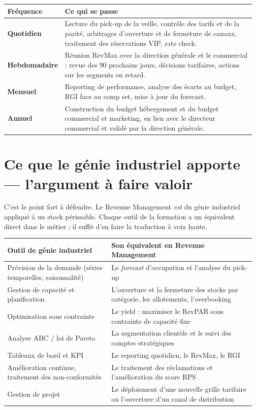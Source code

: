 \documentclass[11pt,a4paper]{article}
\begin{document}
\begin{center}
\small\renewcommand{\arraystretch}{1.1}
\begin{tabularx}{\textwidth}{@{}L{2.9cm} X@{}}
\toprule
{}\textbf{Fréquence} & \textbf{Ce qui se passe} \\
\midrule
\textbf{Quotidien} & Lecture du pick-up de la veille, contrôle des tarifs et de la parité, arbitrages d'ouverture et de fermeture de canaux, traitement des réservations VIP, rate check. \\
\textbf{Hebdomadaire} & Réunion RevMax avec la direction générale et le commercial : revue des 90 prochains jours, décisions tarifaires, actions sur les segments en retard. \\
\textbf{Mensuel} & Reporting de performance, analyse des écarts au budget, RGI face au comp set, mise à jour du forecast. \\
\textbf{Annuel} & Construction du budget hébergement et du budget commercial et marketing, en lien avec le directeur commercial et validé par la direction générale. \\
\bottomrule
\end{tabularx}
\end{center}

\section{Ce que le génie industriel apporte --- l'argument à faire valoir}

C'est le point fort à défendre. Le Revenue Management \emph{est} du génie industriel appliqué à un stock périssable. Chaque outil de la formation a un équivalent direct dans le métier ; il suffit d'en faire la traduction à voix haute.

\begin{center}
\small\renewcommand{\arraystretch}{1.1}
\begin{tabularx}{\textwidth}{@{}L{5.2cm} X@{}}
\toprule
{}\textbf{Outil de génie industriel} & \textbf{Son équivalent en Revenue Management} \\
\midrule
Prévision de la demande (séries temporelles, saisonnalité) & Le \emph{forecast} d'occupation et l'analyse du pick-up \\
Gestion de capacité et planification & L'ouverture et la fermeture des stocks par catégorie, les allotements, l'overbooking \\
Optimisation sous contrainte & Le yield : maximiser le RevPAR sous contrainte de capacité fixe \\
Analyse ABC / loi de Pareto & La segmentation clientèle et le suivi des comptes stratégiques \\
Tableaux de bord et KPI & Le reporting quotidien, le RevMax, le RGI \\
Amélioration continue, traitement des non-conformités & Le traitement des réclamations et l'amélioration du score RPS \\
Gestion de projet & Le déploiement d'une nouvelle grille tarifaire ou l'ouverture d'un canal de distribution \\
\bottomrule
\end{tabularx}
\end{center}
\end{document}

